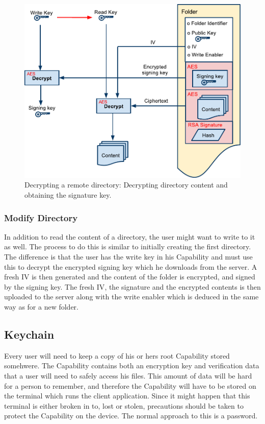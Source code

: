 \documentclass[pdftex,english,10pt,b5paper,twoside]{book}
\begin{document}
\begin{figure}[h!]
    \centering
    \includegraphics[width=\columnwidth]{OpenFolder.pdf}
    \caption{Decrypting a remote directory: Decrypting directory content and
    obtaining the signature key.}
    \label{fig:CS:OD}
\end{figure}

\subsubsection{Modify Directory}

In addition to read the content of a directory, the user might want to write to
it as well. The process to do this is similar to initially creating the first
directory. The difference is that the user has the write key in his Capability
and must use this to decrypt the encrypted signing key which he downloads from
the server. A fresh \ac{IV} is then generated and the content of the folder is
encrypted, and signed by the signing key. The fresh \ac{IV}, the signature and
the encrypted contents is then uploaded to the server along with the write
enabler which is deduced in the same way as for a new folder.

\subsection{Keychain}
Every user will need to keep a copy of his or hers root Capability stored
somehwere. The Capability contains both an encryption key and verification data
that a user will need to safely access his files. This amount of data will be
hard for a person to remember, and therefore the Capability will have to be
stored on the terminal which runs the client application. Since it might happen
that this terminal is either broken in to, lost or stolen, precautions should
be taken to protect the Capability on the device. The normal approach to this
is a password. 
\end{document}
